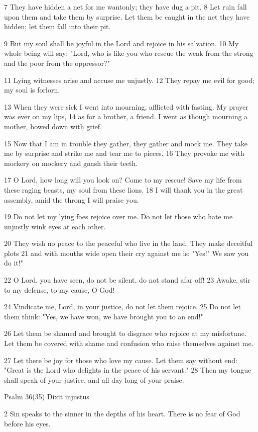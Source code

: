 7 They have hidden a net for me wantonly;
they have dug a pit.
8 Let ruin fall upon them
and take them by surprise.
Let them be caught in the net they have hidden;
let them fall into their pit.

9 But my soul shall be joyful in the Lord
and rejoice in his salvation.
10 My whole being will say:
"Lord, who is like you
who rescue the weak from the strong
and the poor from the oppressor?"

11 Lying witnesses arise
and accuse me unjustly.
12 They repay me evil for good;
my soul is forlorn.

13 When they were sick I went into mourning,
afflicted with fasting.
My prayer was ever on my lips,
14 as for a brother, a friend.
I went as though mourning a mother,
bowed down with grief.

15 Now that I am in trouble they gather,
they gather and mock me.
They take me by surprise and strike me
and tear me to pieces.
16 They provoke me with mockery on mockery
and gnash their teeth.

17 O Lord, how long will you look on?
Come to my rescue!
Save my life from these raging beasts,
my soul from these lions.
18 I will thank you in the great assembly,
amid the throng I will praise you.

19 Do not let my lying foes
rejoice over me.
Do not let those who hate me unjustly
wink eyes at each other.

20 They wish no peace to the peaceful
who live in the land.
They make deceitful plots
21 and with mouths wide open
their cry against me is: "Yes!"
We saw you do it!"

22 O Lord, you have seen, do not be silent,
do not stand afar off!
23 Awake, stir to my defense,
to my cause, O God!

24 Vindicate me, Lord, in your justice,
do not let them rejoice.
25 Do not let them think: "Yes, we have won,
we have brought you to an end!"

26 Let them be shamed and brought to disgrace
who rejoice at my misfortune.
Let them be covered with shame and confusion
who raise themselves against me.

27 Let there be joy for those who love my cause.
Let them say without end:
"Great is the Lord who delights
in the peace of his servant."
28 Then my tongue shall speak of your justice,
and all day long of your praise.


Psalm 36(35) Dixit injustus

2 Sin speaks to the sinner
in the depths of his heart.
There is no fear of God
before his eyes.

